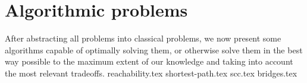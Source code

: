 \chapter{Algorithmic problems}
After abstracting all problems into classical problems, we now present some algorithms capable of optimally solving them, or otherwise solve them in the best way possible to the maximum extent of our knowledge and taking into account the most relevant tradeoffs.
{reachability.tex}
{shortest-path.tex}
{scc.tex}
{bridges.tex}

